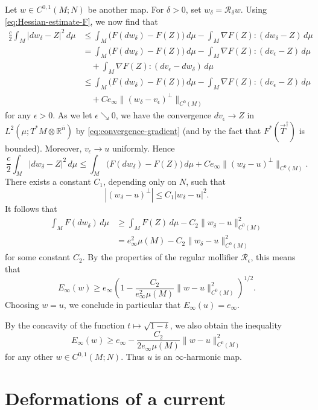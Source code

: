 \documentclass[a4paper]{article}
\newcommand{\R}{\mathbb{R}}
\newcommand{\ndim}{{\bar{n}}}
\theoremstyle{definition}
\theoremstyle{remark}
\begin{document}
Let $w \in C^{0, 1}(M; N)$ be another map. For $\delta > 0$, set $w_\delta = \mathcal{R}_\delta w$.
Using \eqref{eq:Hessian-estimate-F}, we now find that
\[
\begin{split}
\frac{c}{2} \int_M |dw_\delta - Z|^2 \, d\mu & \le \int_M \bigl(F(dw_\delta) - F(Z)\bigr) \, d\mu - \int_M \nabla F(Z) : (dw_\delta - Z) \, d\mu \\
& = \int_M \bigl(F(dw_\delta) - F(Z)\bigr) \, d\mu - \int_M \nabla F(Z) : (dv_\epsilon - Z) \, d\mu \\
& \quad + \int_M \nabla F(Z) : (dv_\epsilon - dw_\delta) \, d\mu\\
& \le \int_M \bigl(F(dw_\delta) - F(Z)\bigr) \, d\mu - \int_M \nabla F(Z) : (dv_\epsilon - Z) \, d\mu \\
& \quad + Ce_\infty \|(w_\delta - v_\epsilon)^\perp\|_{C^0(M)}
\end{split}
\]
for any $\epsilon > 0$. As we let $\epsilon \searrow 0$, we have the convergence
$dv_\epsilon \to Z$ in $L^2(\mu; T^*M \otimes \R^\ndim)$ by \eqref{eq:convergence-gradient} (and by the fact that $F^*(\vec{T}^\dagger)$ is bounded). Moreover, $v_\epsilon \to u$ uniformly. Hence
\[
\frac{c}{2} \int_M |dw_\delta - Z|^2 \, d\mu \le \int_M \bigl(F(dw_\delta) - F(Z)\bigr) \, d\mu + Ce_\infty \|(w_\delta - u)^\perp\|_{C^0(M)}.
\]
There exists a constant $C_1$, depending only on $N$, such that
\[
|(w_\delta - u)^\perp| \le C_1 |w_\delta - u|^2.
\]
It follows that
\[
\begin{split}
\int_M F(dw_\delta) \, d\mu & \ge \int_M F(Z) \, d\mu - C_2 \|w_\delta - u\|_{C^0(M)}^2 \\
& = e_\infty^2 \mu(M) - C_2 \|w_\delta - u\|_{C^0(M)}^2
\end{split}
\]
for some constant $C_2$.
By the properties of the regular mollifier $\mathcal{R}_\epsilon$, this means that
\[
E_\infty(w) \ge e_\infty \left(1 - \frac{C_2}{e_\infty^2 \mu(M)} \|w - u\|_{C^0(M)}^2\right)^{1/2}.
\]
Choosing $w = u$, we conclude in particular that $E_\infty(u) = e_\infty$.

By the concavity of the function $t \mapsto \sqrt{1 - t}$, we also obtain the inequality
\[
E_\infty(w) \ge e_\infty - \frac{C_2}{2e_\infty \mu(M)} \|w - u\|_{C^0(M)}^2
\]
for any other $w \in C^{0, 1}(M; N)$. Thus $u$ is an $\infty$-harmonic map.







\section{Deformations of a current} \label{sct:deformations}
\end{document}
